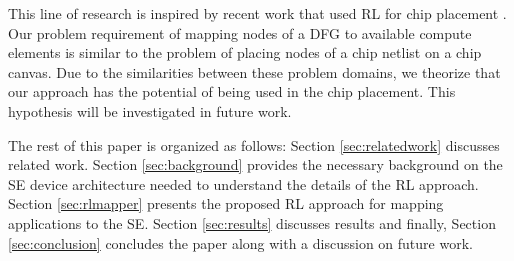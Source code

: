 This line of research is inspired by recent work that used RL for chip placement \cite{mirhoseini2020chip}.
Our problem requirement of mapping nodes of a DFG to available compute elements is similar to the problem of placing nodes of a chip netlist on a chip canvas. 
Due to the similarities between these problem domains, we theorize that our approach has the potential of being used in the chip placement.
This hypothesis will be investigated in future work.

The rest of this paper is organized as follows: 
Section \ref{sec:relatedwork} discusses related work.
Section \ref{sec:background} provides the necessary background on the SE device architecture needed to understand the details of the RL approach.
Section \ref{sec:rlmapper} presents the proposed RL approach for mapping applications to the SE.
Section \ref{sec:results} discusses results and finally, Section \ref{sec:conclusion} concludes the paper along with a discussion on future work.